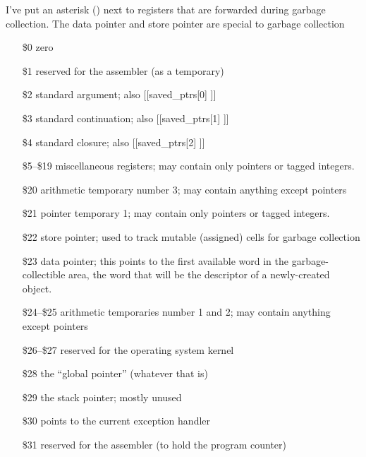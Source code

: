 \def\*{\rlap{${}^*$}}
I've put an asterisk (\*) next to registers that are forwarded
during garbage collection.
The data pointer and store pointer are special to garbage collection
\begin{itemize}
\item[\$0] zero
\item[\$1] reserved for the assembler (as a temporary)
\item[\$2\*] standard argument; also [[saved_ptrs[0] ]]
\item[\$3\*] standard continuation; also [[saved_ptrs[1] ]]
\item[\$4\*] standard closure; also [[saved_ptrs[2] ]]
\item[\$5--\$19\*] miscellaneous registers; 
		may contain only pointers or tagged integers.
\item[\$20] arithmetic temporary number 3; 
		may contain anything except pointers
\item[\$21\*] pointer temporary 1; 
		may contain only pointers or tagged integers.
\item[\$22\*] store pointer;
		used to track mutable (assigned) cells for garbage collection
\item[\$23] data pointer;
		this points to the first available word in the 
		garbage-collectible area, the word that will be the
		descriptor of a newly-created object.
\item[\$24--\$25] arithmetic temporaries number 1 and 2;
		may contain anything except pointers
\item[\$26--\$27] reserved for the operating system kernel
\item[\$28]	the ``global pointer'' (whatever that is)
\item[\$29]	the stack pointer; mostly unused
\item[\$30\*] points to the current exception handler
\item[\$31] reserved for the assembler (to hold the program counter)
\end{itemize} 
